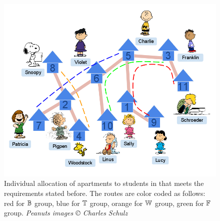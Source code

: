 \documentclass[MS]             %
              {iitmdiss_as}    %
\begin{document}
\begin{figure}[htbp]
  \includegraphics[scale=0.5]{../img/3_infinite_loop.png}
  \caption{\figtabsize Individual allocation of apartments to students
    in {\residenceblock} that meets the requirements stated before.
    The routes are color coded as follows: red for
    \textcolor{red}{$\mathbb{B}$} group, blue for \textcolor{blue}{$\mathbb{T}$}
    group, orange for \textcolor{yellow}{$\mathbb{W}$} group, green
    for \textcolor{green}{$\mathbb{F}$} group. {\tiny {\em Peanuts images
        {\copyright} Charles Schulz}}}%
  \label{fig:streetmappathpeople}
\end{figure}
\end{document}

